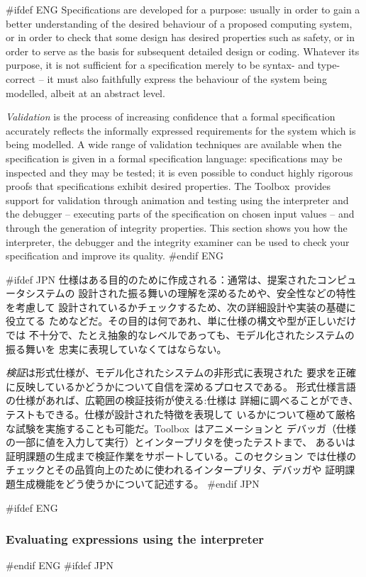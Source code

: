 \documentclass[\pformat,12pt]{article}
\newcommand{\Toolbox}{Toolbox}
\newcommand{\Toolbox}{Toolbox}
\begin{document}
#ifdef ENG
Specifications are developed for a purpose: usually in order to gain a
better understanding of the desired behaviour of a proposed computing
system, or in order to check that some design has desired properties
such as safety, or in order to serve as the basis for subsequent
detailed design or coding. Whatever its purpose, it is not sufficient
for a specification merely to be syntax- and type-correct -- it must
also faithfully express the behaviour of the system being modelled,
albeit at an abstract level.

{\em Validation\/} is the process of increasing confidence that a
formal specification accurately reflects the informally expressed
requirements for the system which is being modelled. A wide range of
validation 
techniques are available when the specification is given in a formal
specification language: specifications may be inspected and they may
be tested; it is even possible to conduct highly rigorous proofs that
specifications exhibit desired properties. The \Toolbox\ provides
support for validation through animation and testing using the
interpreter and the debugger -- executing parts
of the specification on chosen input values -- and through the
generation of integrity properties. This section shows you
how the interpreter, the debugger and the integrity examiner can be
used to check your specification and improve its quality.
#endif ENG

#ifdef JPN
仕様はある目的のために作成される：通常は、提案されたコンピュータシステムの
設計された振る舞いの理解を深めるためや、安全性などの特性を考慮して
設計されているかチェックするため、次の詳細設計や実装の基礎に役立てる
ためなどだ。その目的は何であれ、単に仕様の構文や型が正しいだけでは
不十分で、たとえ抽象的なレベルであっても、モデル化されたシステムの振る舞いを
忠実に表現していなくてはならない。

{\em 検証\/}は形式仕様が、モデル化されたシステムの非形式に表現された
要求を正確に反映しているかどうかについて自信を深めるプロセスである。
形式仕様言語の仕様があれば、広範囲の検証技術が使える:仕様は
詳細に調べることができ、テストもできる。仕様が設計された特徴を表現して
いるかについて極めて厳格な試験を実施することも可能だ。\Toolbox\ はアニメーションと
デバッガ（仕様の一部に値を入力して実行）とインタープリタを使ったテストまで、
あるいは証明課題の生成まで検証作業をサポートしている。このセクション
では仕様のチェックとその品質向上のために使われるインタープリタ、デバッガや
証明課題生成機能をどう使うかについて記述する。
#endif JPN

#ifdef ENG
\subsubsection{Evaluating expressions using the interpreter}
\label{interpreter}
#endif ENG
#ifdef JPN
\end{document}
